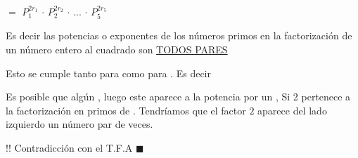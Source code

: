 \documentclass[12pt]{article}
\renewcommand{\qedsymbol}{$\blacksquare$}
\newenvironment{MyColorPar}[1]{%
    \leavevmode\color{#1}\ignorespaces%
}{%
}%
\begin{document}
\begin{MyColorPar}{Tarawera}
{{\hspace{3.8cm} $=$ $P_{1}^{2r_{1}}$ $\cdot$ $P_{2}^{2r_{2}}$ $\cdot$
$...$ $\cdot$ $P_{5}^{2r_{5}}$ 
}} \vspace{0.5cm}

Es decir las potencias o exponentes de los números primos en la factorización de un número entero al cuadrado son {\underline{TODOS PARES}} \vspace{0.5cm}

\newpage

Esto se cumple tanto para {} como para {}. Es decir {} \vspace{0.5cm}

Es posible que algún {}, luego este {} aparece a la potencia por un {}, {} {\black{$\Longrightarrow$}}  Si 2 pertenece a la factorización en primos de {}. Tendríamos que el factor $2$ aparece del lado izquierdo un número {} par de veces. \vspace{0.5cm}

{\LARGE{!!}} Contradicción con el T.F.A \qedsymbol


\end{MyColorPar}
\end{document}

